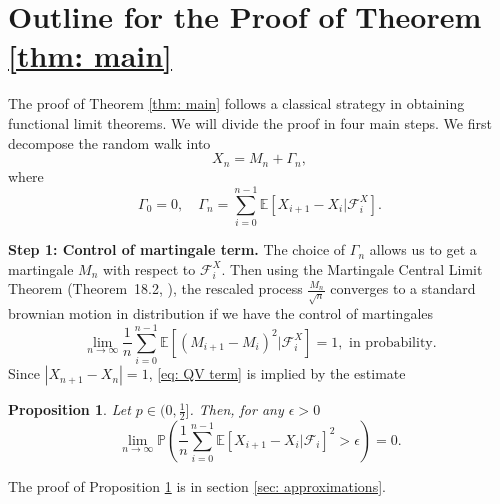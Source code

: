 \documentclass[twoside,12pt,a4paper]{article}
\newtheorem{proposition}{Proposition}[section]
\numberwithin{equation}{section}
\newcommand{\abs}[1]{\left\vert #1 \right\vert}
\begin{document}
	\section{Outline for the Proof of Theorem \ref{thm: main}}\label{sec: proof of main}
	The proof of Theorem \ref{thm: main} follows a classical strategy in obtaining functional limit theorems. We will divide the proof in four main steps. We first decompose the random walk into
	$$X_n = M_n+ \Gamma_n, $$ where
	$$ 
	\Gamma_0 = 0, \quad \Gamma_n = \sum_{i=0}^{n-1} \mathbb{E}\left[ X_{i+1}-X_i | \mathcal{F}_i^X \right].
	$$ 
	
	\textbf{Step 1: Control of martingale term.}
	The choice of $\Gamma_n$ allows us to get a martingale $M_n$ with respect to $\mathcal{F}_i^X.$ Then using the Martingale Central Limit Theorem (Theorem~18.2, \cite{B99}), the rescaled process $\frac{M_n}{\sqrt{n}}$ converges to a standard brownian motion in distribution if we have the control of martingales 
	\begin{equation}\label{eq: QV term}
		\lim_{n\to \infty}\frac{1}{n} \sum_{i=0}^{n-1}\mathbb{E}\left[ (M_{i+1}- M_{i})^2 |\mathcal{F}_i^X \right] =1,  \mbox{ in probability}.
	\end{equation}
	Since $\abs{X_{n+1}-X_n}=1$,  \eqref{eq: QV term} is implied by the estimate
	\begin{proposition} \label{lm: control of martingale} Let $p\in (0,\frac{1}{2}]$. Then, for any $\epsilon >0$
		\begin{equation}\label{eq:  term}
			\lim_{n \to \infty }\mathbb{P}\left(\frac{1}{n} \sum_{i = 0}^{n-1} \mathbb{E}\left[ X_{i+1} - X_i | \mathcal{F}_i \right]^2 > \epsilon \right) =0. 
		\end{equation}
	\end{proposition}
	The proof of Proposition \ref{lm: control of martingale} is in section \ref{sec: approximations}.
	
\end{document}

